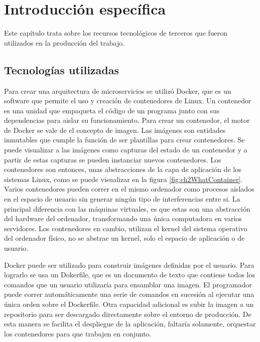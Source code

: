 \chapter{Introducción específica} %

\label{Chapter2}

Este capítulo trata sobre los recursos tecnológicos de terceros que fueron utilizados en la producción del trabajo.

\section{Tecnologías utilizadas}

Para crear una arquitectura de microservicios se utilizó Docker, que es un software que permite el uso y creación de contenedores de Linux.
Un contenedor es una unidad que empaqueta el código de un programa junto con sus dependencias para aislar su funcionamiento.
Para crear un contenedor, el motor de Docker se vale de el concepto de imagen.
Las imágenes son entidades inmutables que cumple la función de ser plantillas para crear contenedores.
Se puede visualizar a las imágenes como capturas del estado de un contenedor y a partir de estas capturas se pueden instanciar nuevos contenedores.
Los contenedores son entonces, unas abstracciones de la capa de aplicación de los sistemas Linux, como se puede visualizar en la figura \ref{fig:ch2WhatContainer}.
Varios contenedores pueden correr en el mismo ordenador como procesos aislados en el espacio de usuario sin generar ningún tipo de interferencias entre si.
La principal diferencia con las máquinas virtuales, es que estas son una abstracción del hardware del ordenador, transformando una única computadora en varios servidores.
Los contenedores en cambio, utilizan el kernel del sistema operativo del ordenador físico, no se abstrae un kernel, solo el espacio de aplicación o de usuario.

Docker puede ser utilizado para construir imágenes definidas por el usuario.
Para lograrlo se usa un Dokerfile, que es un documento de texto que contiene todos los comandos que un usuario utilizaría para ensamblar una imagen.
El programador puede correr automáticamente una serie de comandos en sucesión al ejecutar una única orden sobre el Dockerfile.
Otra capacidad adicional es subir la imagen a un repositorio para ser descargado directamente sobre el entorno de producción.
De esta manera se facilita el despliegue de la aplicación, faltaría solamente, orquestar los contenedores para que trabajen en conjunto. 

